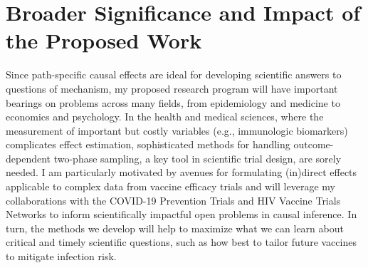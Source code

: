 \section{Broader Significance and Impact of the Proposed Work}

Since path-specific causal effects are ideal for developing scientific answers
to questions of mechanism, my proposed research program will have important
bearings on problems across many fields, from epidemiology and medicine to
economics and psychology. In the health and medical sciences, where the
measurement of important but costly variables (e.g., immunologic biomarkers)
complicates effect estimation, sophisticated methods for handling
outcome-dependent two-phase sampling, a key tool in scientific trial design, are
sorely needed. I am particularly motivated by avenues for formulating (in)direct
effects applicable to complex data from vaccine efficacy trials and will
leverage my collaborations with the COVID-19 Prevention Trials and HIV Vaccine
Trials Networks to inform scientifically impactful open problems in causal
inference. In turn, the methods we develop will help to maximize what we can
learn about critical and timely scientific questions, such as how best to tailor
future vaccines to mitigate infection risk.

